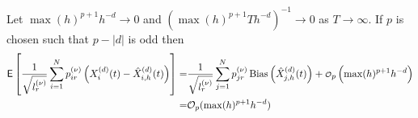 Let $\max(h)^{p+1} h^{ -d } \rightarrow 0$ and $\left(\max(h)^{p+1} T h^{ -d }\right)^{-1} \rightarrow 0$ as $T \rightarrow \infty $. %
If $p$ is chosen such that $p-|d|$ is odd then %
\begin{equation*}\label{hbias}
 \begin{aligned}
\mathop{\mbox{\sf E}}\left[\frac{1}{\sqrt{l_r^{(\nu)}}}\sum_{i=1}^N p^{(\nu)}_{ir} \left(X_i^{(d)}(t)-\hat{X}^{(d)}_{i,h}(t)\right)\right]=&\frac{1}{\sqrt{ l^{(\nu)}_{r}}}  \sum_{j=1}^N p^{(\nu)}_{jr} \operatorname{Bias}\left(\hat{X}^{(d)}_{j,h}(t)\right)+ \mbox{\scriptsize $\mathcal{O}$}_p\left(  \max(h)^{p+1} h^{-d}\right)  \\
=&   \mathcal{O}_p( \max(h)^{p+1} h^{-d}) 
\end{aligned}
\end{equation*}

